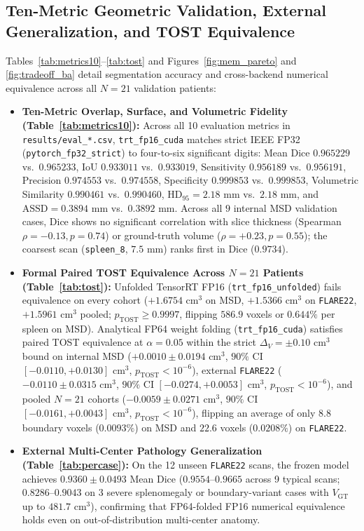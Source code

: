 \documentclass[10pt,twocolumn]{article}
\begin{document}
\subsection{Ten-Metric Geometric Validation, External Generalization, and TOST Equivalence}
Tables~\ref{tab:metrics10}--\ref{tab:tost} and Figures~\ref{fig:mem_pareto} and \ref{fig:tradeoff_ba} detail segmentation accuracy and cross-backend numerical equivalence across all $N = 21$ validation patients:
\begin{itemize}
    \item \textbf{Ten-Metric Overlap, Surface, and Volumetric Fidelity (Table~\ref{tab:metrics10}):} Across all 10 evaluation metrics in \texttt{results/eval\_*.csv}, \texttt{trt\_fp16\_cuda} matches strict IEEE FP32 (\texttt{pytorch\_fp32\_strict}) to four-to-six significant digits: Mean Dice $0.965229$ vs.\ $0.965233$, IoU $0.933011$ vs.\ $0.933019$, Sensitivity $0.956189$ vs.\ $0.956191$, Precision $0.974553$ vs.\ $0.974558$, Specificity $0.999853$ vs.\ $0.999853$, Volumetric Similarity $0.990461$ vs.\ $0.990460$, $\text{HD}_{95} = 2.18\text{ mm}$ vs.\ $2.18\text{ mm}$, and $\text{ASSD} = 0.3894\text{ mm}$ vs.\ $0.3892\text{ mm}$. Across all $9$ internal MSD validation cases, Dice shows no significant correlation with slice thickness (Spearman $\rho = -0.13, p = 0.74$) or ground-truth volume ($\rho = +0.23, p = 0.55$); the coarsest scan (\texttt{spleen\_8}, $7.5\text{ mm}$) ranks first in Dice ($0.9734$).
    \item \textbf{Formal Paired TOST Equivalence Across $N = 21$ Patients (Table~\ref{tab:tost}):} Unfolded TensorRT FP16 (\texttt{trt\_fp16\_unfolded}) fails equivalence on every cohort ($+1.6754\text{ cm}^3$ on MSD, $+1.5366\text{ cm}^3$ on \texttt{FLARE22}, $+1.5961\text{ cm}^3$ pooled; $p_{\text{TOST}} \ge 0.9997$, flipping $586.9$ voxels or $0.644\%$ per spleen on MSD). Analytical FP64 weight folding (\texttt{trt\_fp16\_cuda}) satisfies paired TOST equivalence at $\alpha = 0.05$ within the strict $\Delta_V = \pm 0.10\text{ cm}^3$ bound on internal MSD ($+0.0010 \pm 0.0194\text{ cm}^3$, $90\%$ CI $[-0.0110, +0.0130]\text{ cm}^3$, $p_{\text{TOST}} < 10^{-6}$), external \texttt{FLARE22} ($-0.0110 \pm 0.0315\text{ cm}^3$, $90\%$ CI $[-0.0274, +0.0053]\text{ cm}^3$, $p_{\text{TOST}} < 10^{-6}$), and pooled $N = 21$ cohorts ($-0.0059 \pm 0.0271\text{ cm}^3$, $90\%$ CI $[-0.0161, +0.0043]\text{ cm}^3$, $p_{\text{TOST}} < 10^{-6}$), flipping an average of only $8.8$ boundary voxels ($0.0093\%$) on MSD and $22.6$ voxels ($0.0208\%$) on \texttt{FLARE22}.
    \item \textbf{External Multi-Center Pathology Generalization (Table~\ref{tab:percase}):} On the 12 unseen \texttt{FLARE22} scans, the frozen model achieves $0.9360 \pm 0.0493$ Mean Dice ($0.9554\text{--}0.9665$ across 9 typical scans; $0.8286\text{--}0.9043$ on 3 severe splenomegaly or boundary-variant cases with $V_{\text{GT}}$ up to $481.7\text{ cm}^3$), confirming that FP64-folded FP16 numerical equivalence holds even on out-of-distribution multi-center anatomy.
\end{itemize}
\end{document}
